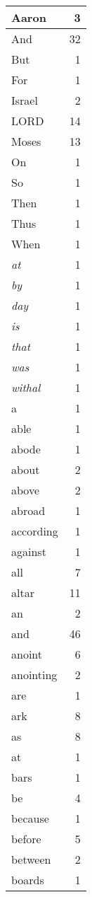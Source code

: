 \begin{center}
\begin{longtable}{l|r}
\hline \hline
\endlastfoot
Aaron & 3 \\ \hline
And & 32 \\ \hline
But & 1 \\ \hline
For & 1 \\ \hline
Israel & 2 \\ \hline
LORD & 14 \\ \hline
Moses & 13 \\ \hline
On & 1 \\ \hline
So & 1 \\ \hline
Then & 1 \\ \hline
Thus & 1 \\ \hline
When & 1 \\ \hline
\emph{at} & 1 \\ \hline
\emph{by} & 1 \\ \hline
\emph{day} & 1 \\ \hline
\emph{is} & 1 \\ \hline
\emph{that} & 1 \\ \hline
\emph{was} & 1 \\ \hline
\emph{withal} & 1 \\ \hline
a & 1 \\ \hline
able & 1 \\ \hline
abode & 1 \\ \hline
about & 2 \\ \hline
above & 2 \\ \hline
abroad & 1 \\ \hline
according & 1 \\ \hline
against & 1 \\ \hline
all & 7 \\ \hline
altar & 11 \\ \hline
an & 2 \\ \hline
and & 46 \\ \hline
anoint & 6 \\ \hline
anointing & 2 \\ \hline
are & 1 \\ \hline
ark & 8 \\ \hline
as & 8 \\ \hline
at & 1 \\ \hline
bars & 1 \\ \hline
be & 4 \\ \hline
because & 1 \\ \hline
before & 5 \\ \hline
between & 2 \\ \hline
boards & 1 \\ \hline

\end{longtable}
\end{center}
